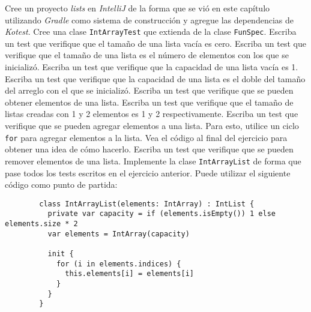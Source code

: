 \begin{Exercise}
    \Question Cree un proyecto \textit{lists} en \textit{IntelliJ} de la forma que se vió en 
      este capítulo utilizando \textit{Gradle} como sistema de construcción y agregue las 
      dependencias de \textit{Kotest}.
    \Question Cree una clase \texttt{IntArrayTest} que extienda de la clase \texttt{FunSpec}.
    \Question Escriba un test que verifique que el tamaño de una lista vacía es cero.
    \Question Escriba un test que verifique que el tamaño de una lista es el número de elementos
      con los que se inicializó.
    \Question Escriba un test que verifique que la capacidad de una lista vacía es 1.
    \Question Escriba un test que verifique que la capacidad de una lista es el doble del tamaño del
      arreglo con el que se inicializó.
    \Question Escriba un test que verifique que se pueden obtener elementos de una lista.
    \Question Escriba un test que verifique que el tamaño de listas creadas con 1 y 2 elementos
      es 1 y 2 respectivamente.
    \Question Escriba un test que verifique que se pueden agregar elementos a una lista.
      Para esto, utilice un ciclo \texttt{for} para agregar elementos a la lista.
      Vea el código al final del ejercicio para obtener una idea de cómo hacerlo.
    \Question Escriba un test que verifique que se pueden remover elementos de una lista.
    \Question Implemente la clase \texttt{IntArrayList} de forma que pase todos los tests
      escritos en el ejercicio anterior.
      Puede utilizar el siguiente código como punto de partida:
      \begin{verbatim}
        class IntArrayList(elements: IntArray) : IntList {
          private var capacity = if (elements.isEmpty()) 1 else elements.size * 2
          var elements = IntArray(capacity)

          init {
            for (i in elements.indices) {
              this.elements[i] = elements[i]
            }
          }
        }
      \end{verbatim}


\end{Exercise}
